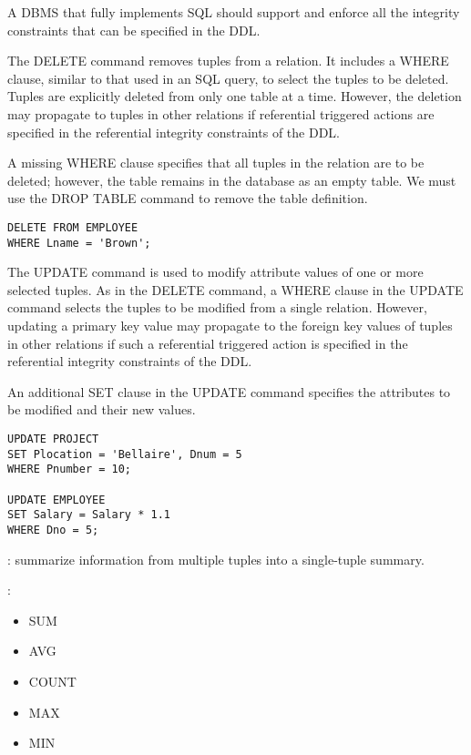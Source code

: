     \par A DBMS that fully implements SQL should support and enforce all the integrity
constraints that can be specified in the DDL.

    \par The DELETE command removes tuples from a relation. It includes a WHERE clause, similar to that used in an SQL query, to select the tuples to be deleted. Tuples are explicitly deleted from only one table at a time. However, the deletion may propagate to tuples in other relations if referential triggered actions are specified in the referential integrity constraints of the DDL.
    \par A missing WHERE clause specifies that all tuples in the relation are to be deleted; however, the table remains in the database as an empty table. We must use the DROP TABLE command to remove the table definition.
    \begin{verbatim}
DELETE FROM EMPLOYEE
WHERE Lname = 'Brown';
    \end{verbatim}

    \par The UPDATE command is used to modify attribute values of one or more selected tuples. As in the DELETE command, a WHERE clause in the UPDATE command selects the tuples to be modified from a single relation. However, updating a primary key value may propagate to the foreign key values of tuples in other relations if such a referential triggered action is specified in the referential integrity constraints of the DDL.
    \par An additional SET clause in the UPDATE command specifies the attributes to be modified and their new values.
    \begin{verbatim}
UPDATE PROJECT
SET Plocation = 'Bellaire', Dnum = 5
WHERE Pnumber = 10;

UPDATE EMPLOYEE
SET Salary = Salary * 1.1
WHERE Dno = 5;
    \end{verbatim}

  \par {}: summarize information from multiple tuples into a single-tuple summary.

  \par {}:
    \begin{itemize}
      \item SUM
      \item AVG
      \item COUNT
      \item MAX
      \item MIN
    \end{itemize}

